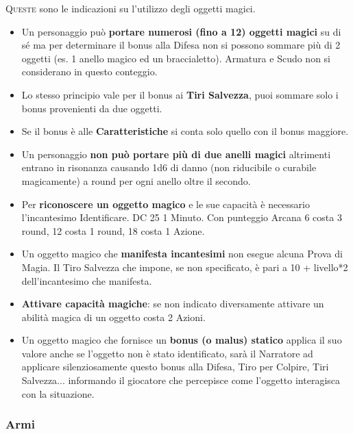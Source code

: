 \begin{multicols}{2}

	\lettrine[lines=2, lhang=0.33, loversize=0.25, findent=1.5em]{Q}{ueste} sono le indicazioni su l'utilizzo degli oggetti magici.

	\label{oggetti-magici}
	\begin{itemize}
		\item
		Un personaggio può \textbf{portare numerosi (fino a 12) oggetti magici} su di sé ma per determinare il bonus alla Difesa non si possono sommare più di 2 oggetti (es. 1 anello magico ed un braccialetto). Armatura e Scudo non si considerano in questo conteggio.
		\item
		Lo stesso principio vale per il bonus ai \textbf{Tiri Salvezza}, puoi sommare solo i bonus provenienti da due oggetti.
		\item
		Se il bonus è alle \textbf{Caratteristiche} si conta solo quello con il bonus maggiore.
		\item
		Un personaggio \textbf{non può portare più di due anelli magici} altrimenti entrano in risonanza causando 1d6 di danno (non riducibile o curabile magicamente) a round per ogni anello oltre il secondo.
		\item
		Per \textbf{riconoscere un oggetto magico} e le sue capacità è necessario l'incantesimo Identificare. DC 25 1 Minuto. Con punteggio Arcana 6 costa 3 round, 12 costa 1 round, 18 costa 1 Azione.
		\item
		Un oggetto magico che \textbf{manifesta incantesimi} non esegue alcuna Prova di Magia. Il Tiro Salvezza che impone, se non specificato, è pari a 10 + livello*2 dell'incantesimo che manifesta.
		\item
		\textbf{Attivare capacità magiche}: se non indicato diversamente attivare un abilità magica di un oggetto costa 2 Azioni.
		\item
		Un oggetto magico che fornisce un \textbf{bonus (o malus) statico} applica il suo valore anche se l'oggetto non è stato identificato, sarà il Narratore ad applicare silenziosamente questo bonus alla Difesa, Tiro per Colpire, Tiri Salvezza... informando il giocatore che percepisce come l'oggetto interagisca con la situazione.

	\end{itemize}

	\subsubsection{Armi}


\end{multicols}
